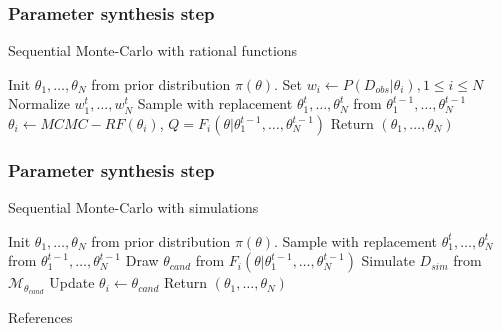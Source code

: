 \documentclass{beamer}
\begin{document}
\begin{frame}
    \frametitle{Parameter synthesis step}
    \begin{algorithm}[H]
        \caption{Sequential Monte-Carlo with rational functions}
        \label{rf-smc-alg}
        \begin{algorithmic}[1]
            \State Init $\theta_1,\ldots,\theta_N$ from prior distribution $\pi(\theta)$.
            \State Set  $w_i \leftarrow P(D_{obs}|\theta_i), 1\leq i\leq N$
            \State Normalize $w^t_1,\ldots,w^t_N$
            \State Sample with replacement $\theta^t_1,\ldots,\theta^t_N$ from $\theta^{t-1}_1,\ldots,\theta^{t-1}_N$
            \State $\theta_i \leftarrow MCMC-RF(\theta_i)$, $Q = F_i(\theta|\theta^{t-1}_1,\ldots,\theta^{t-1}_N)$
            \EndFor
            \EndFor
            \State Return $(\theta_1,\ldots,\theta_N)$
            \EndProcedure
        \end{algorithmic}
    \end{algorithm}
\end{frame}

\begin{frame}
    \frametitle{Parameter synthesis step}
    \begin{algorithm}[H]
        \caption{Sequential Monte-Carlo with simulations}
        \label{smc-abc-smc-alg}
        \begin{algorithmic}[1]
            \State Init $\theta_1,\ldots,\theta_N$ from prior distribution $\pi(\theta)$.
            \State Sample with replacement $\theta^t_1,\ldots,\theta^t_N$ from $\theta^{t-1}_1,\ldots,\theta^{t-1}_N$
            \State Draw $\theta_{cand}$ from $F_i(\theta|\theta^{t-1}_1,\ldots,\theta^{t-1}_N)$
            \State Simulate $D_{sim}$ from $\mathcal{M}_{\theta_{cand}}$
            \State Update $\theta_i \leftarrow \theta_{cand}$
            \EndIf
            \EndIf
            \EndFor
            \EndFor
            \State Return $(\theta_1,\ldots,\theta_N)$
            \EndProcedure
        \end{algorithmic}
    \end{algorithm}
\end{frame}


\begin{frame}[allowframebreaks]{References}
    \printbibliography
\end{frame}
\end{document}
